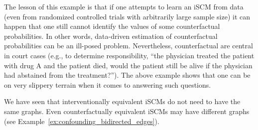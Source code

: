 The lesson of this example is that if one attempts to learn an iSCM from data (even from randomized controlled trials with arbitrarily large sample size) it can happen that one still cannot identify the values of some counterfactual probabilities. 
In other words, data-driven estimation of counterfactual probabilities can be an ill-posed problem. 
Nevertheless, counterfactual are central in court cases (e.g., to determine responsibility, ``the physician treated the patient with drug A and the patient died, would the patient still be alive if the physician had abstained from the treatment?''). 
The above example shows that one can be on very slippery terrain when it comes to answering such questions. 

We have seen that interventionally equivalent iSCMs do not need to have the same graphs.
Even counterfactually equivalent iSCMs may have different graphs (see Example~\ref{ex:confounding_bidirected_edges}).

